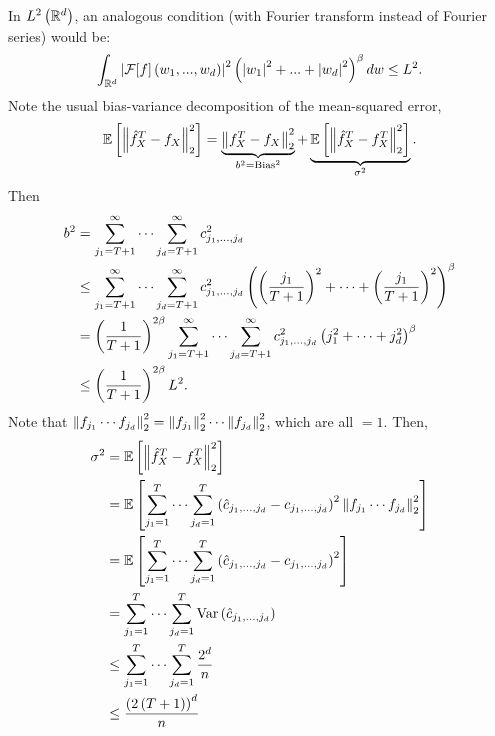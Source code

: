 {In $L^2\left(\mathbb{R}^d\right)$, an analogous condition (with Fourier transform instead of Fourier series) would be:
\begin{equation*}
  \int_{\mathbb{R}^d} \left| \mathcal F[f]\left(w_1,...,w_d\right)\right|^2\left(\left| w_1\right|^2+...+\left| w_d\right|^2\right)^\beta dw \leq L^2.
\end{equation*}}
Note the usual bias-variance decomposition of the mean-squared error,
\begin{equation*}
  \mathbb{E}\left[\left\| \hat f_X^T - f_X \right\|^2_2\right] = \underbrace{\left\| f_X^T - f_X  \right\|^2_2}_{b^2=\text{Bias}^2} + \underbrace{\mathbb{E}\left[\left\| \hat{f}_X^T - f_X^T \right\|_2^2\right]}_{\sigma^2}.
\end{equation*}
Then
\begin{equation*}
  \begin{split}
    b^2 & = \sum_{j_1 = T+1}^\infty \cdots \sum_{j_d = T+1}^\infty c^2_{j_1,\ldots, j_d}                                                                        \\
        & \leq \sum_{j_1 = T+1}^\infty \cdots \sum_{j_d = T+1}^\infty c^2_{j_1,\ldots, j_d} \left(\left(\frac{j_1}{T+1}\right)^2 + \cdots + \left(\frac{j_1}{T+1}\right)^2\right)^\beta \\
        & = \left(\frac{1}{T+1}\right)^{2\beta } \sum_{j_1 = T+1}^\infty \cdots \sum_{j_d = T+1}^\infty c^2_{j_1,\ldots, j_d} \left(j_1^2 + \cdots + j_d^2\right)^\beta         \\
        & \leq \left(\frac{1}{T+1}\right)^{2\beta} L^2.
  \end{split}
\end{equation*}
Note that $\left\| f_{j_1}\cdots f_{j_d} \right\|_2^2 = \left\| f_{j_1} \right\|_2^2 \cdots \left\| f_{j_d} \right\|_2^2$, which are all $=1$. Then,
\begin{equation*}
  \begin{split}
    \sigma^2 & = \mathbb{E}\left[ \left\| \hat{f}_X^T - f_X^T \right\|_2^2\right]                                                                                             \\
             & = \mathbb{E}\left[\sum_{j_1=1}^T \cdots \sum_{j_d=1}^T \left(\hat{c}_{j_1,\ldots,j_d} - c_{j_1,\ldots, j_d}\right)^2\left\| f_{j_1}\cdots f_{j_d} \right\|^2_2 \right] \\
             & = \mathbb{E}\left[\sum_{j_1=1}^T \cdots \sum_{j_d=1}^T \left(\hat{c}_{j_1,\ldots,j_d} - c_{j_1,\ldots, j_d}\right)^2\right]                                  \\
             & = \sum_{j_1=1}^T \cdots \sum_{j_d=1}^T \mathrm{Var}\left(\hat c_{j_1,...,j_d}\right)                                                                  \\
             & \leq \sum_{j_1=1}^T \cdots \sum_{j_d=1}^T \frac{2^d}{n}                                                                               \\
             & \leq \frac{\left(2 \left(T+1\right) \right)^d }{n}
  \end{split}
\end{equation*}
